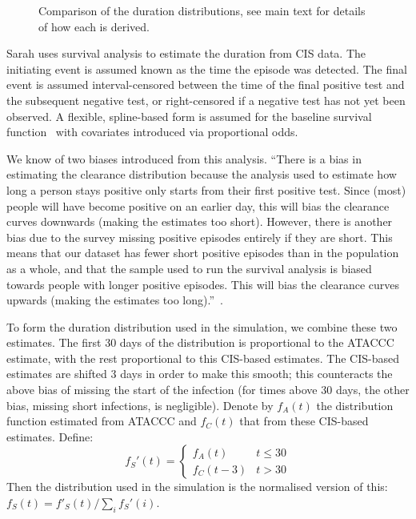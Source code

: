 \documentclass[thesis.tex]{subfiles}
\begin{document}
\begin{figure}
  \caption{Comparison of the duration distributions, see main text for details of how each is derived. \label{perf-test:fig:duration-dist}}
\end{figure}

Sarah uses survival analysis to estimate the duration from CIS data.
The initiating event is assumed known as the time the episode was detected.
The final event is assumed interval-censored between the time of the final positive test and the subsequent negative test, or right-censored if a negative test has not yet been observed.
A flexible, spline-based form is assumed for the baseline survival function~\autocite{roystonSTPM,roystonFlexible} with covariates introduced via proportional odds.

We know of two biases introduced from this analysis.
\enquote{There is a bias in estimating the clearance distribution because the analysis used to estimate how long a person stays positive only starts from their first positive test.
Since (most) people will have become positive on an earlier day, this will bias the clearance curves downwards (making the estimates too short).
However, there is another bias due to the survey missing positive episodes entirely if they are short.
This means that our dataset has fewer short positive episodes than in the population as a whole, and that the sample used to run the survival analysis is biased towards people with longer positive episodes.
This will bias the clearance curves upwards (making the estimates too long).}~\autocite{cisMethodsONS}.

To form the duration distribution used in the simulation, we combine these two estimates.
The first 30 days of the distribution is proportional to the ATACCC estimate, with the rest proportional to this CIS-based estimates.
The CIS-based estimates are shifted 3 days in order to make this smooth; this counteracts the above bias of missing the start of the infection (for times above 30 days, the other bias, missing short infections, is negligible).
Denote by $f_A(t)$ the distribution function estimated from ATACCC and $f_C(t)$ that from these CIS-based estimates.
Define:
$$
f_S'(t) = \begin{cases}
	f_A(t) &t \leq 30 \\
	f_C(t-3) &t > 30
\end{cases}
$$
Then the distribution used in the simulation is the normalised version of this: $f_S(t) = f'_S(t)/\sum_i f_S'(i)$.
\end{document}
